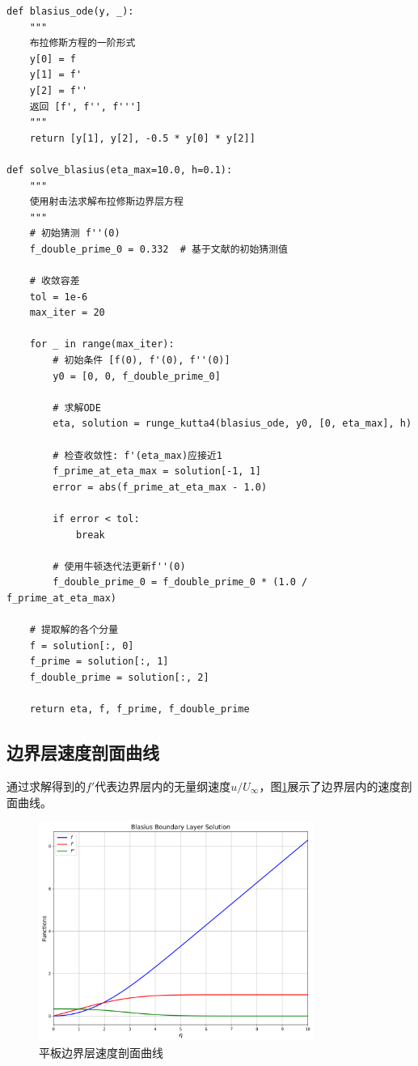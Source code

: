 \documentclass[12pt,a4paper]{article}
\begin{document}
\begin{lstlisting}[caption=布拉修斯方程求解的关键代码]
def blasius_ode(y, _):
    """
    布拉修斯方程的一阶形式
    y[0] = f
    y[1] = f'
    y[2] = f''
    返回 [f', f'', f''']
    """
    return [y[1], y[2], -0.5 * y[0] * y[2]]

def solve_blasius(eta_max=10.0, h=0.1):
    """
    使用射击法求解布拉修斯边界层方程
    """
    # 初始猜测 f''(0)
    f_double_prime_0 = 0.332  # 基于文献的初始猜测值
    
    # 收敛容差
    tol = 1e-6
    max_iter = 20
    
    for _ in range(max_iter):
        # 初始条件 [f(0), f'(0), f''(0)]
        y0 = [0, 0, f_double_prime_0]
        
        # 求解ODE
        eta, solution = runge_kutta4(blasius_ode, y0, [0, eta_max], h)
        
        # 检查收敛性: f'(eta_max)应接近1
        f_prime_at_eta_max = solution[-1, 1]
        error = abs(f_prime_at_eta_max - 1.0)
        
        if error < tol:
            break
        
        # 使用牛顿迭代法更新f''(0)
        f_double_prime_0 = f_double_prime_0 * (1.0 / f_prime_at_eta_max)
    
    # 提取解的各个分量
    f = solution[:, 0]
    f_prime = solution[:, 1]
    f_double_prime = solution[:, 2]
    
    return eta, f, f_prime, f_double_prime
\end{lstlisting}

\subsection{边界层速度剖面曲线}
通过求解得到的$f'$代表边界层内的无量纲速度$u/U_\infty$，图\ref{fig:velocity_profile}展示了边界层内的速度剖面曲线。

\begin{figure}[htbp]
  \centering
  \includegraphics[width=0.8\textwidth]{fig/blasius_solution.png}
  \caption{平板边界层速度剖面曲线}
  \label{fig:velocity_profile}
\end{figure}
\end{document}
